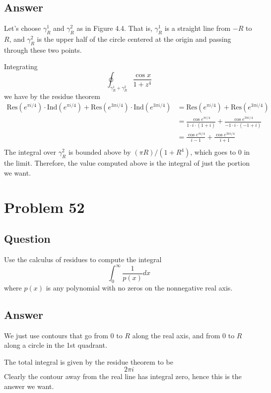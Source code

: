 \documentclass[11pt]{article}
\begin{document}
\subsection{Answer}
Let's choose $\gamma_R^1$ and $\gamma_R^2$ as in Figure 4.4. That is, $\gamma_R^1$ is a straight line from $-R$ to $R$, and $\gamma_R^2$ is the upper half of the circle centered at the origin and passing through these two points.

Integrating 
\[\oint_{\gamma_R^1 + \gamma_R^2} \frac{\cos x}{1 + z^4}\]
we have by the residue theorem
\begin{align*}\mbox{Res}(e^{\pi i / 4  }) \cdot \mbox{Ind}( e^{\pi i / 4  }) +  \mbox{Res}(e^{ 3 \pi i / 4  }) \cdot \mbox{Ind}( e^{3 \pi i / 4  }) &=  \mbox{Res}(e^{\pi i / 4  }) +  \mbox{Res}(e^{ 3 \pi i / 4  }) \\
& = \frac{\cos e^{\pi i / 4  } }{1 \cdot i \cdot (1 + i)}+ \frac{\cos e^{3 \pi i / 4  } }{-1 \cdot i \cdot (-1 + i)}\\
& = \frac{\cos e^{\pi i / 4  } }{  i -1}+ \frac{\cos e^{3 \pi i / 4  } }{i +1}\\\end{align*}
The integral over $\gamma_R^2$ is bounded above by $ (\pi R)  / (1 + R^4)$, which goes to 0 in the limit. Therefore, the value computed above is the integral of just the portion we want.

\section{Problem 52}
\subsection{Question}
Use the calculus of residues to compute the integral
\[\int_0^\infty \frac{1}{p(x)} dx\]
 where $p(x)$ is any polynomial with no zeros on the nonnegative real axis.
\subsection{Answer}
We just use contours that go from $0$ to $R$ along the real axis, and from $0$ to $R$ along a circle in the 1st quadrant. 

The total integral is given by the residue theorem to be 
\[2 \pi i\]
Clearly the contour away from the real line has integral zero, hence this is the answer we want.
\end{document}
